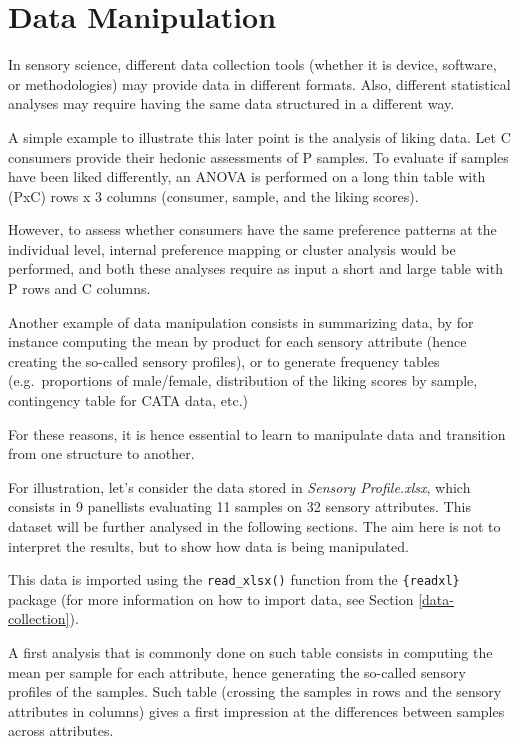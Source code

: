 \documentclass[
]{book}
\begin{document}
\hypertarget{data-manip}{%
\chapter{Data Manipulation}\label{data-manip}}

In sensory science, different data collection tools (whether it is device, software, or methodologies) may provide data in different formats. Also, different statistical analyses may require having the same data structured in a different way.

A simple example to illustrate this later point is the analysis of liking data.
Let C consumers provide their hedonic assessments of P samples. To evaluate if samples have been liked differently, an ANOVA is performed on a long thin table with (PxC) rows x 3 columns (consumer, sample, and the liking scores).

However, to assess whether consumers have the same preference patterns at the individual level, internal preference mapping or cluster analysis would be performed, and both these analyses require as input a short and large table with P rows and C columns.

Another example of data manipulation consists in summarizing data, by for instance computing the mean by product for each sensory attribute (hence creating the so-called sensory profiles), or to generate frequency tables (e.g.~proportions of male/female, distribution of the liking scores by sample, contingency table for CATA data, etc.)

For these reasons, it is hence essential to learn to manipulate data and transition from one structure to another.

For illustration, let's consider the data stored in \emph{Sensory Profile.xlsx}, which consists in 9 panellists evaluating 11 samples on 32 sensory attributes. This dataset will be further analysed in the following sections. The aim here is not to interpret the results, but to show how data is being manipulated.

This data is imported using the \texttt{read\_xlsx()} function from the \texttt{\{readxl\}} package (for more information on how to import data, see Section \ref{data-collection}).

A first analysis that is commonly done on such table consists in computing the mean per sample for each attribute, hence generating the so-called sensory profiles of the samples. Such table (crossing the samples in rows and the sensory attributes in columns) gives a first impression at the differences between samples across attributes.
\end{document}

